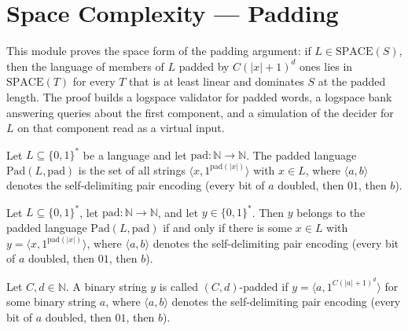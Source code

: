 \section{Space Complexity --- Padding}
This module proves the space form of the padding argument: if $L \in \mathrm{SPACE}(S)$,
then the language of members of $L$ padded by $C(|x|+1)^d$ ones lies in $\mathrm{SPACE}(T)$ for every
$T$ that is at least linear and dominates $S$ at the padded length. The proof builds a
logspace validator for padded words, a logspace bank answering queries about the first component,
and a simulation of the decider for $L$ on that component read as a virtual input.

\begin{definition}
\label{Complexity.padLang}
\leanok
{}
Let $L \subseteq \{0,1\}^*$ be a language and let $\mathrm{pad} : \mathbb{N} \to \mathbb{N}$.
The padded language $\mathrm{Pad}(L,\mathrm{pad})$ is the set of all strings
$\langle x, 1^{\mathrm{pad}(|x|)}\rangle$ with $x \in L$, where $\langle a,b\rangle$ denotes the self-delimiting pair encoding (every bit of $a$ doubled, then $01$, then $b$).
\end{definition}

\begin{theorem}
\label{Complexity.mem_padLang_iff}
\leanok
{}
Let $L \subseteq \{0,1\}^*$, let $\mathrm{pad} : \mathbb{N} \to \mathbb{N}$, and let
$y \in \{0,1\}^*$. Then $y$ belongs to the padded language $\mathrm{Pad}(L,\mathrm{pad})$ if and
only if there is some $x \in L$ with $y = \langle x, 1^{\mathrm{pad}(|x|)}\rangle$, where $\langle a,b\rangle$ denotes the self-delimiting pair encoding (every bit of $a$ doubled, then $01$, then $b$).
\end{theorem}

\begin{definition}
\label{Complexity.epadValid}
\leanok
{}
Let $C, d \in \mathbb{N}$. A binary string $y$ is called $(C,d)$-padded if
$y = \langle a, 1^{C(|a|+1)^d}\rangle$ for some binary string $a$, where $\langle a,b\rangle$ denotes the self-delimiting pair encoding (every bit of $a$ doubled, then $01$, then $b$).
\end{definition}

